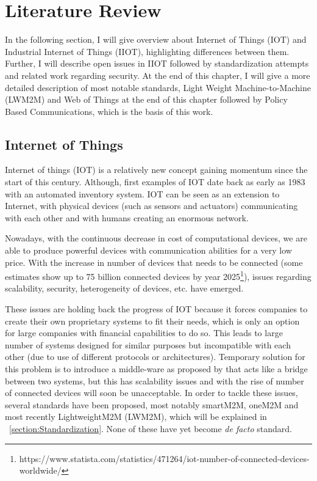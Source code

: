 \chapter{Literature Review}
\label{chapter:background} 

In the following section, I will give overview about Internet of Things (IOT) and Industrial Internet of Things (IIOT), highlighting differences between them. Further, I will describe open issues in IIOT followed by standardization attempts and related work regarding security. At the end of this chapter, I will give a more detailed description of most notable standards, Light Weight Machine-to-Machine (LWM2M) and Web of Things at the end of this chapter followed by Policy Based Communications, which is the basis of this work.

\section{Internet of Things}

Internet of things (IOT) is a relatively new concept gaining momentum since the start of this century. Although, first examples
of IOT date back as early as 1983 with an automated inventory system. IOT can be seen as an extension to Internet, with physical devices (such as sensors and actuators) communicating with each other and with humans creating an enormous network.

Nowadays, with the continuous decrease in cost of computational devices, 
we are able to produce powerful devices with communication abilities for a very low price. With the increase in number 
of devices that needs to be connected (some estimates show up to 75 billion connected devices by year 2025\footnote{https://www.statista.com/statistics/471264/iot-number-of-connected-devices-worldwide/}), issues regarding scalability, security, heterogeneity of devices, etc. have emerged. 

These issues are holding back the progress of IOT because it forces companies to create their own proprietary systems to fit their needs, which is only an option for
large companies with financial capabilities to do so. This leads to large number of systems designed for similar purposes but incompatible with each other (due to use of different protocols or architectures). Temporary solution for this problem is to introduce a middle-ware as proposed by \cite{Bandyopadhyay2011} that acts like a bridge between two systems, but this has scalability issues and with the rise of number of connected devices will soon be unacceptable. In order to tackle these issues, several standards have been proposed, most notably smartM2M, oneM2M and most recently LightweightM2M (LWM2M), which will be explained in ~\ref{section:Standardization}. None of these have yet become \emph{de facto} standard.

